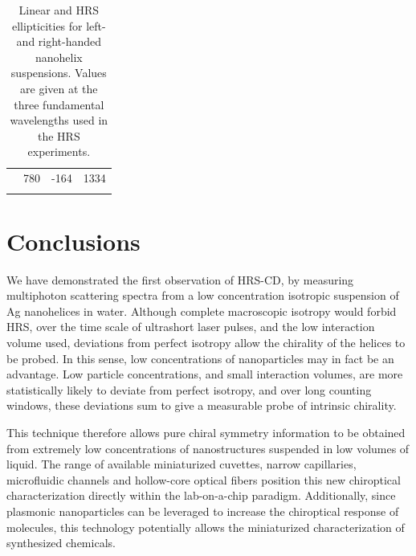 \begin{table}[tbp]
\begin{tabular}{llll}
                                                                & 780                                                                    & -164                                                                  & 1334                                                               \\ 
    \lasthline
    \end{tabular}
    \caption{Linear and HRS ellipticities for left- and right-handed nanohelix suspensions. Values are given at the three fundamental wavelengths used in the HRS experiments.}
    \label{table:HRS:ellipticity}
\end{table}


\section{Conclusions}
We have demonstrated the first observation of HRS-CD, by measuring multiphoton scattering spectra from a low concentration isotropic suspension of Ag nanohelices in water. Although complete macroscopic isotropy would forbid HRS, over the time scale of ultrashort laser pulses, and the low interaction volume used, deviations from perfect isotropy allow the chirality of the helices to be probed. In this sense, low concentrations of nanoparticles may in fact be an advantage. Low particle concentrations, and small interaction volumes, are more statistically likely to deviate from perfect isotropy, and over long counting windows, these deviations sum to give a measurable probe of intrinsic chirality.

This technique therefore allows pure chiral symmetry information to be obtained from extremely low concentrations of nanostructures suspended in low volumes of liquid. The range of available miniaturized cuvettes, narrow capillaries, microfluidic channels and hollow-core optical fibers position this new chiroptical characterization directly within the lab-on-a-chip paradigm. Additionally, since plasmonic nanoparticles can be leveraged to increase the chiroptical response of molecules, this technology potentially allows the miniaturized characterization of synthesized chemicals. 

